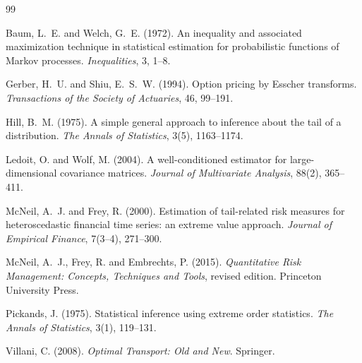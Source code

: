 \documentclass[12pt]{article}
\begin{document}


\begin{thebibliography}{99}

Baum, L.~E. and Welch, G.~E. (1972).
\newblock An inequality and associated maximization technique in statistical
  estimation for probabilistic functions of Markov processes.
\newblock \textit{Inequalities}, 3, 1--8.

Gerber, H.~U. and Shiu, E.~S.~W. (1994).
\newblock Option pricing by Esscher transforms.
\newblock \textit{Transactions of the Society of Actuaries}, 46, 99--191.

Hill, B.~M. (1975).
\newblock A simple general approach to inference about the tail of a distribution.
\newblock \textit{The Annals of Statistics}, 3(5), 1163--1174.

Ledoit, O. and Wolf, M. (2004).
\newblock A well-conditioned estimator for large-dimensional covariance matrices.
\newblock \textit{Journal of Multivariate Analysis}, 88(2), 365--411.

McNeil, A.~J. and Frey, R. (2000).
\newblock Estimation of tail-related risk measures for heteroscedastic financial
  time series: an extreme value approach.
\newblock \textit{Journal of Empirical Finance}, 7(3--4), 271--300.

McNeil, A.~J., Frey, R. and Embrechts, P. (2015).
\newblock \textit{Quantitative Risk Management: Concepts, Techniques and Tools},
  revised edition.
\newblock Princeton University Press.

Pickands, J. (1975).
\newblock Statistical inference using extreme order statistics.
\newblock \textit{The Annals of Statistics}, 3(1), 119--131.

Villani, C. (2008).
\newblock \textit{Optimal Transport: Old and New}.
\newblock Springer.

\end{thebibliography}
\end{document}
